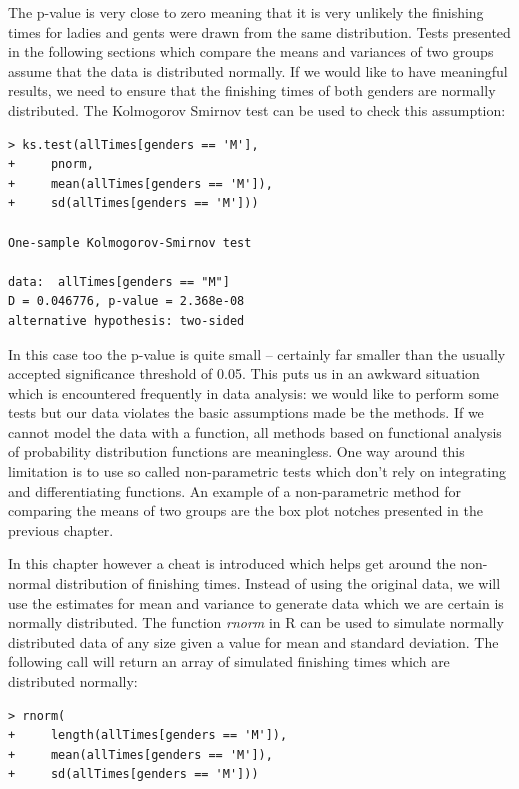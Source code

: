 \documentclass{tufte-book} %
\begin{document}
The \hbox{p-value} is very close to zero meaning that it is very unlikely the finishing times for ladies and gents were drawn from the same distribution. Tests presented in the following sections which compare the means and variances of two groups assume that the data is distributed normally. If we would like to have meaningful results, we need to ensure that the finishing times of both genders are normally distributed. The Kolmogorov Smirnov test can be used to check this assumption:

\begin{Verbatim}
> ks.test(allTimes[genders == 'M'],
+     pnorm,
+     mean(allTimes[genders == 'M']),
+     sd(allTimes[genders == 'M']))

One-sample Kolmogorov-Smirnov test

data:  allTimes[genders == "M"]
D = 0.046776, p-value = 2.368e-08
alternative hypothesis: two-sided
\end{Verbatim}

In this case too the \hbox{p-value} is quite small -- certainly far smaller than the usually accepted significance threshold of 0.05. This puts us in an awkward situation which is encountered frequently in data analysis: we would like to perform some tests but our data violates the basic assumptions made be the methods. If we cannot model the data with a function, all methods based on functional analysis of probability distribution functions are meaningless. One way around this limitation is to use so called non-parametric tests which don't rely on integrating and differentiating functions. An example of a non-parametric method for comparing the means of two groups are the box plot notches presented in the previous chapter.

In this chapter however a cheat is introduced which helps get around the non-normal distribution of finishing times. Instead of using the original data, we will use the estimates for mean and variance to generate data which we are certain is normally distributed. The function {\em rnorm} in R can be used to simulate normally distributed data of any size given a value for mean and standard deviation. The following call will return an array of simulated finishing times which are distributed normally:

\begin{Verbatim}
> rnorm(
+     length(allTimes[genders == 'M']), 
+     mean(allTimes[genders == 'M']), 
+     sd(allTimes[genders == 'M']))
\end{Verbatim}
\end{document}
